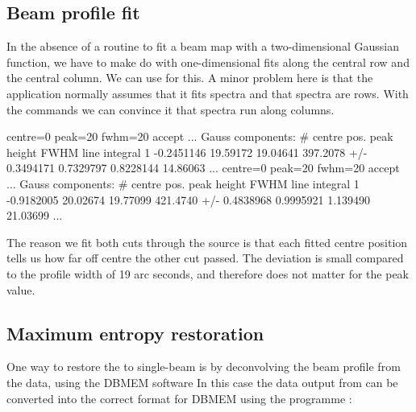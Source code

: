 \documentclass[11pt,noabs]{starlink}
\begin{document}
\subsection{\label{beam}Beam profile fit}

   In the absence of a routine to fit a beam map with a two-dimensional
   Gaussian function, we have to make do with one-dimensional fits
   along the central row and the central column. We can use
\texttt{}
   for this. A minor problem here is that the application normally
   assumes that it fits spectra and that spectra are rows. With the
\texttt{}
   commands we can convince it that spectra run along columns.

\begin{terminalv}
 centre=0 peak=20 fwhm=20 accept
...
Gauss components:
 #   centre pos.    peak height       FWHM       line integral
 1   -0.2451146       19.59172       19.04641       397.2078
+/-   0.3494171      0.7329797      0.8228144       14.86063
...
 centre=0 peak=20 fwhm=20 accept
...
Gauss components:
 #   centre pos.    peak height       FWHM       line integral
 1   -0.9182005       20.02674       19.77099       421.4740
+/-   0.4838968      0.9995921       1.139490       21.03699
...
\end{terminalv}

   The reason we fit both cuts through the source is that each fitted
   centre position tells us how far off centre the other cut passed. The
   deviation is small compared to the profile width of 19 arc seconds,
   and therefore does not matter for the peak value.


\subsection{\label{dbmem}Maximum entropy restoration}

   One way to restore the
   to single-beam is by deconvolving the beam
   profile from the data, using the DBMEM software
   In this case the data output from
\texttt{}
   can be converted into the correct format for DBMEM using the
   programme
\texttt{}:
\end{document}
